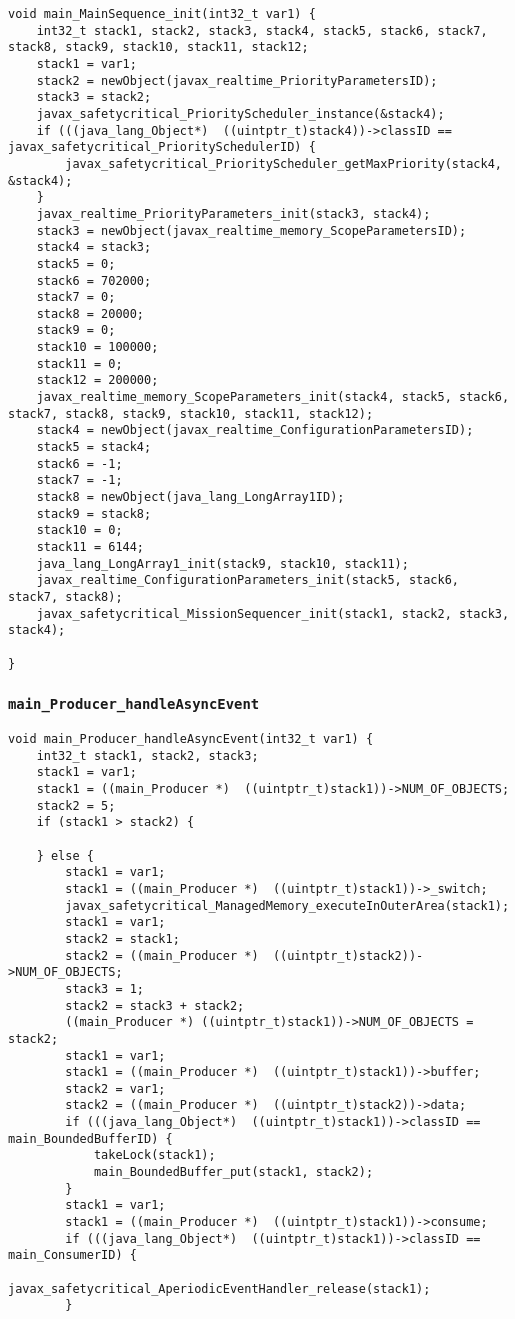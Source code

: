 \begin{landscape}
\begin{multicols}{2}
\begin{lstlisting}[firstnumber=1422]
void main_MainSequence_init(int32_t var1) {
	int32_t stack1, stack2, stack3, stack4, stack5, stack6, stack7, stack8, stack9, stack10, stack11, stack12;
	stack1 = var1;
	stack2 = newObject(javax_realtime_PriorityParametersID);
	stack3 = stack2;
	javax_safetycritical_PriorityScheduler_instance(&stack4);
	if (((java_lang_Object*)  ((uintptr_t)stack4))->classID == javax_safetycritical_PrioritySchedulerID) {
		javax_safetycritical_PriorityScheduler_getMaxPriority(stack4, &stack4);
	}
	javax_realtime_PriorityParameters_init(stack3, stack4);
	stack3 = newObject(javax_realtime_memory_ScopeParametersID);
	stack4 = stack3;
	stack5 = 0;
	stack6 = 702000;
	stack7 = 0;
	stack8 = 20000;
	stack9 = 0;
	stack10 = 100000;
	stack11 = 0;
	stack12 = 200000;
	javax_realtime_memory_ScopeParameters_init(stack4, stack5, stack6, stack7, stack8, stack9, stack10, stack11, stack12);
	stack4 = newObject(javax_realtime_ConfigurationParametersID);
	stack5 = stack4;
	stack6 = -1;
	stack7 = -1;
	stack8 = newObject(java_lang_LongArray1ID);
	stack9 = stack8;
	stack10 = 0;
	stack11 = 6144;
	java_lang_LongArray1_init(stack9, stack10, stack11);
	javax_realtime_ConfigurationParameters_init(stack5, stack6, stack7, stack8);
	javax_safetycritical_MissionSequencer_init(stack1, stack2, stack3, stack4);

}
\end{lstlisting}

\subsubsection{\texttt{main\_Producer\_handleAsyncEvent}}

\begin{lstlisting}[firstnumber=1676]
void main_Producer_handleAsyncEvent(int32_t var1) {
	int32_t stack1, stack2, stack3;
	stack1 = var1;
	stack1 = ((main_Producer *)  ((uintptr_t)stack1))->NUM_OF_OBJECTS;
	stack2 = 5;
	if (stack1 > stack2) {
		
	} else {
		stack1 = var1;
		stack1 = ((main_Producer *)  ((uintptr_t)stack1))->_switch;
		javax_safetycritical_ManagedMemory_executeInOuterArea(stack1);
		stack1 = var1;
		stack2 = stack1;
		stack2 = ((main_Producer *)  ((uintptr_t)stack2))->NUM_OF_OBJECTS;
		stack3 = 1;
		stack2 = stack3 + stack2;
		((main_Producer *) ((uintptr_t)stack1))->NUM_OF_OBJECTS = stack2;
		stack1 = var1;
		stack1 = ((main_Producer *)  ((uintptr_t)stack1))->buffer;
		stack2 = var1;
		stack2 = ((main_Producer *)  ((uintptr_t)stack2))->data;
		if (((java_lang_Object*)  ((uintptr_t)stack1))->classID == main_BoundedBufferID) {
			takeLock(stack1);
			main_BoundedBuffer_put(stack1, stack2);
		}
		stack1 = var1;
		stack1 = ((main_Producer *)  ((uintptr_t)stack1))->consume;
		if (((java_lang_Object*)  ((uintptr_t)stack1))->classID == main_ConsumerID) {
			javax_safetycritical_AperiodicEventHandler_release(stack1);
		}


\end{lstlisting}
\end{multicols}
\end{landscape}
